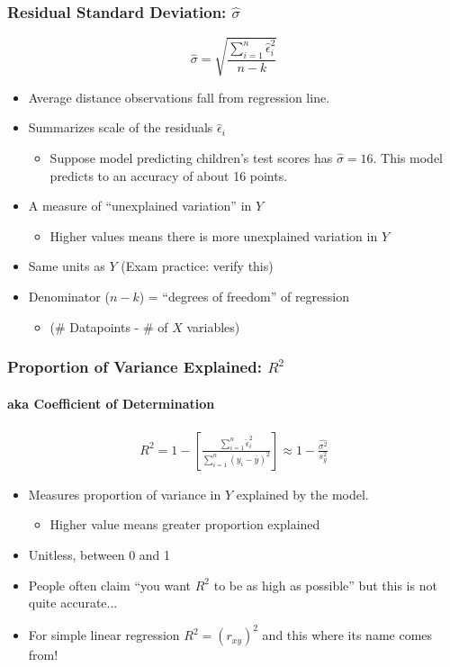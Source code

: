 \documentclass[handout]{beamer}
\begin{document}
\begin{frame}
\frametitle{Residual Standard Deviation: $\widehat{\sigma}$}
	$$\widehat{\sigma}  = \sqrt{\frac{\sum_{i=1}^n \widehat{\epsilon}_i^2}{n -k}}$$ 
	\begin{itemize}
		\item 	Average distance observations fall from regression line.
		\item Summarizes scale of the residuals $\widehat{\epsilon}_i$ 
				\begin{itemize}
					\item Suppose model predicting children's test scores has $\widehat{\sigma}=16$. This model predicts to an accuracy of about 16 points. 
				\end{itemize}
	\item A  measure of ``unexplained variation'' in $Y$
		\begin{itemize}
			\item Higher values means there is more unexplained variation in $Y$ 
		\end{itemize}
	\item Same units as $Y$ (Exam practice: verify this) 
	\item Denominator  ($n-k$) = ``degrees of freedom'' of regression
		\begin{itemize}
			\item (\# Datapoints - \# of $X$ variables) 
		\end{itemize}
	\end{itemize}

\end{frame}




\begin{frame}
\frametitle{Proportion of Variance Explained: $R^2$}
\framesubtitle{aka Coefficient of Determination}
	\begin{eqnarray*}
		R^2 =  1 - \left[\frac{\sum_{i=1}^n \widehat{\epsilon}_i^2}{\sum_{i=1}^n (y_i - \bar{y})^2} \right]  \approx 1 - \frac{\widehat{\sigma^2}}{s_y^2}
	\end{eqnarray*}
		\begin{itemize}
			\item Measures proportion of variance in $Y$ explained by the model. 
			\begin{itemize}
			\item Higher value means greater proportion explained 
			\end{itemize}
			\item Unitless, between 0 and 1 
			\item People often claim ``you want $R^2$ to be as high as possible'' but this is not quite accurate... 
			\item \alert{For simple linear regression $R^2 = (r_{xy})^2$ and this where its name comes from!}
		\end{itemize}
\end{frame}
\end{document}
